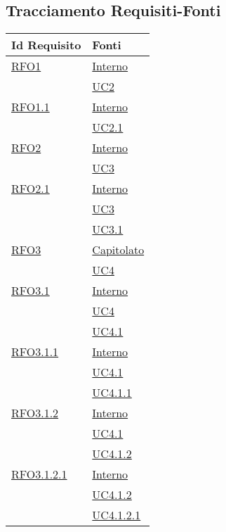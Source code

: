 \subsection{Tracciamento Requisiti-Fonti}
\normalsize
\begin{longtable}{|>{\centering}m{5cm}|m{5cm}<{\centering}|}
\hline
\textbf{Id Requisito} & \textbf{Fonti}\\
\hline
\endhead
\hyperlink{RFO1}{RFO1} & \hyperlink{Interno}{Interno}\\  &\hyperref[UC2]{UC2}\\ \hline

\hyperlink{RFO1.1}{RFO1.1} &  \hyperlink{Interno}{Interno}\\  &\hyperref[UC2.1]{UC2.1}\\ \hline

\hyperlink{RFO2}{RFO2}  &  \hyperlink{Interno}{Interno}\\  &\hyperref[UC3]{UC3}\\ \hline

\hyperlink{RFO2.1}{RFO2.1} &   \hyperlink{Interno}{Interno}\\ &\hyperref[UC3]{UC3}\\ 
& \hyperref[UC3.1]{UC3.1}\\ \hline

\hyperlink{RFO3}{RFO3} &  \hyperlink{Capitolato}{Capitolato}\\  &\hyperref[UC4]{UC4}\\ \hline

\hyperlink{RFO3.1}{RFO3.1} &  \hyperlink{Interno}{Interno}\\ &\hyperref[UC4]{UC4}\\ &\hyperref[UC4.1]{UC4.1}\\ \hline

\hyperlink{RFO3.1.1}{RFO3.1.1} &  \hyperlink{Interno}{Interno}\\ &\hyperref[UC4.1]{UC4.1}\\ &\hyperref[UC4.1.1]{UC4.1.1}\\ \hline

\hyperlink{RFO3.1.2}{RFO3.1.2} &  \hyperlink{Interno}{Interno}\\ &\hyperref[UC4.1]{UC4.1}\\ &\hyperref[UC4.1.2]{UC4.1.2}\\ \hline

\hyperlink{RFO3.1.2.1}{RFO3.1.2.1} &  \hyperlink{Interno}{Interno}\\ &\hyperref[UC4.1.2]{UC4.1.2}\\ &\hyperref[UC4.1.2.1]{UC4.1.2.1}\\ \hline


\end{longtable}
